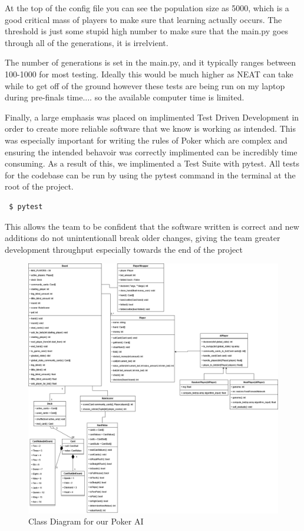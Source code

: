 At the top of the config file you can see the population size as 5000, which is a good critical mass of players
to make sure that learning actually occurs. The threshold is just some stupid high number to make sure that the
main.py goes through all of the generations, it is irrelvient.

The number of generations is set in the main.py, and it typically ranges between 100-1000 for most testing.
Ideally this would be much higher as NEAT can take while to get off of the ground however these tests are being
run on my laptop during pre-finals time.... so the available computer time is limited.

Finally, a large emphasis was placed on implimented Test Driven Development in order
to create more reliable software that we know is working as intended. This was especially important for writing
the rules of Poker which are complex and ensuring the intended behavoir was correctly implimented can be
incredibly time consuming. As a result of this, we implimented a Test Suite with pytest. All tests for the
codebase can be run by using the pytest command in the terminal at the root of the project.
\begin{verbatim}
 $ pytest
\end{verbatim}

This allows the team to be confident that the software written is correct and new additions do not
unintentionall break older changes, giving the team greater development throughput especially towards the end
of the project

\clearpage
\begin{figure}[H]
    \centering
    \includegraphics[scale=0.4]{resources/Poker_AI_-Class_Diagram.drawio.png}
    \caption{Class Diagram for our Poker AI}
    \label{fig:classDiagram}
\end{figure}



